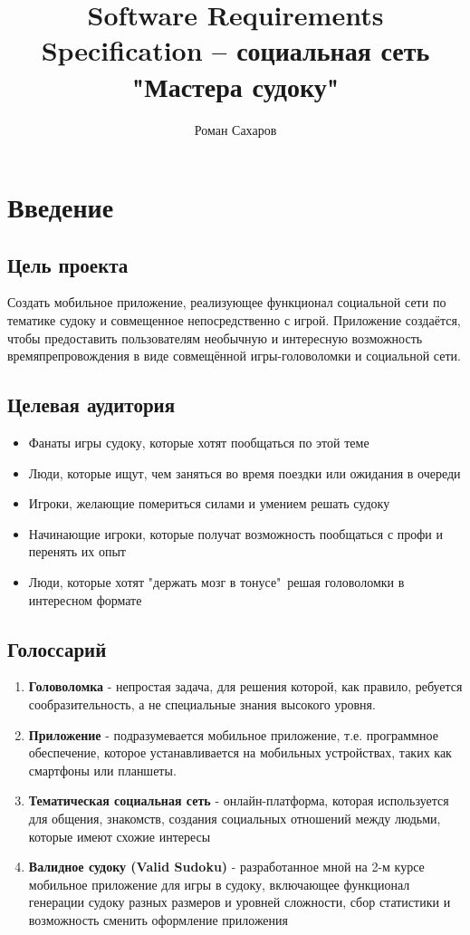 \documentclass{article}
\title{Software Requirements Specification -- социальная сеть "Мастера судоку"}
\author{ Роман Сахаров}
\date{}
\begin{document}
\maketitle

\section*{Введение}
\subsection*{Цель проекта}
Создать мобильное приложение, реализующее функционал социальной сети по тематике судоку и совмещенное непосредственно с игрой. Приложение создаётся, чтобы предоставить пользователям необычную и интересную возможность времяпрепровождения в виде совмещённой игры-головоломки и социальной сети. 

\subsection*{Целевая аудитория}
\begin{itemize}
    \item Фанаты игры судоку, которые хотят пообщаться по этой теме 
    \item Люди, которые ищут, чем заняться во время поездки или ожидания в очереди
    \item Игроки, желающие помериться силами и умением решать судоку
    \item  Начинающие игроки, которые получат возможность пообщаться с профи и перенять их
опыт
    \item Люди, которые хотят "держать мозг в тонусе"\, решая головоломки в интересном формате
\end{itemize}

\subsection*{Голоссарий}
\begin{enumerate}
    \item  \textbf{Головоломка} - непростая задача, для решения которой, как правило, ребуется сообразительность, а не специальные знания высокого уровня.
    \item \textbf{Приложение} - подразумевается мобильное приложение, т.е. программное 
    обеспечение, которое устанавливается на мобильных устройствах, таких как смартфоны или планшеты.
    \item \textbf{Тематическая социальная сеть} - онлайн-платформа, которая используется для общения, знакомств, создания социальных отношений между людьми, которые имеют схожие интересы
    \item \textbf{Валидное судоку (Valid Sudoku)} - разработанное мной на 2-м курсе мобильное приложение для игры в судоку, включающее функционал генерации судоку разных размеров и уровней сложности, сбор статистики и возможность сменить оформление приложения

\end{enumerate}
\end{document}
